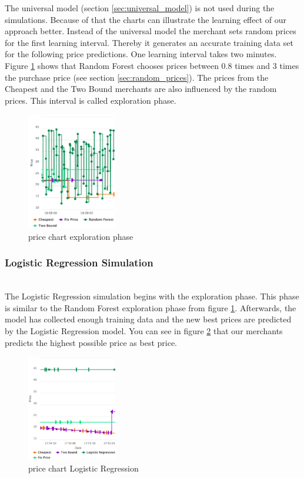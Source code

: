     The universal model (section \ref{sec:universal_model}) is not used during the simulations. Because of that the charts can illustrate the learning effect of our approach better. Instead of the universal model the merchant sets random prices for the first learning interval. Thereby it generates an accurate training data set for the following price predictions. One learning interval takes two minutes. Figure \ref{fig2} shows that Random Forest chooses prices between 0.8 times and 3 times the purchase price (see section \ref{sec:random_prices}). The prices from the Cheapest and the Two Bound merchants are also influenced by the random prices. This interval is called exploration phase.
    
    \begin{figure}[ht]
        \centering
        \includegraphics[width=0.35\textwidth]{img/rndmfrst_explor2.png}
        \caption{price chart exploration phase}
        \label{fig2}
    \end{figure}
 

\subsubsection{Logistic Regression Simulation}
    ~\\
    The Logistic Regression simulation begins with the exploration phase. This phase is similar to the Random Forest exploration phase from figure \ref{fig2}. Afterwards, the model has collected enough training data and the new best prices are predicted by the Logistic Regression model. You can see in figure \ref{fig3} that our merchants predicts the highest possible price as best price.

    \begin{figure}[ht]
        \centering
        \includegraphics[width=0.35\textwidth]{img/logit_prices.png}
        \caption{price chart Logistic Regression}
        \label{fig3}
    \end{figure}

